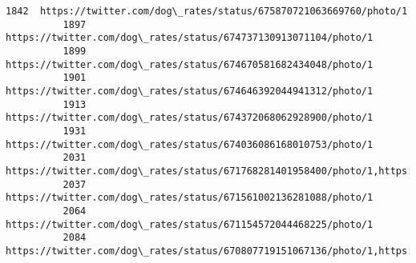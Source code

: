 \documentclass[11pt]{article}
\begin{document}
\begin{Verbatim}[commandchars=\\\{\}]
          1842  https://twitter.com/dog\_rates/status/675870721063669760/photo/1                                                                                                                                                                                                   
          1897  https://twitter.com/dog\_rates/status/674737130913071104/photo/1                                                                                                                                                                                                   
          1899  https://twitter.com/dog\_rates/status/674670581682434048/photo/1                                                                                                                                                                                                   
          1901  https://twitter.com/dog\_rates/status/674646392044941312/photo/1                                                                                                                                                                                                   
          1913  https://twitter.com/dog\_rates/status/674372068062928900/photo/1                                                                                                                                                                                                   
          1931  https://twitter.com/dog\_rates/status/674036086168010753/photo/1                                                                                                                                                                                                   
          2031  https://twitter.com/dog\_rates/status/671768281401958400/photo/1,https://twitter.com/dog\_rates/status/671768281401958400/photo/1                                                                                                                                   
          2037  https://twitter.com/dog\_rates/status/671561002136281088/photo/1                                                                                                                                                                                                   
          2064  https://twitter.com/dog\_rates/status/671154572044468225/photo/1                                                                                                                                                                                                   
          2084  https://twitter.com/dog\_rates/status/670807719151067136/photo/1,https://twitter.com/dog\_rates/status/670807719151067136/photo/1,https://twitter.com/dog\_rates/status/670807719151067136/photo/1                                                                   

\end{Verbatim}
\end{document}
